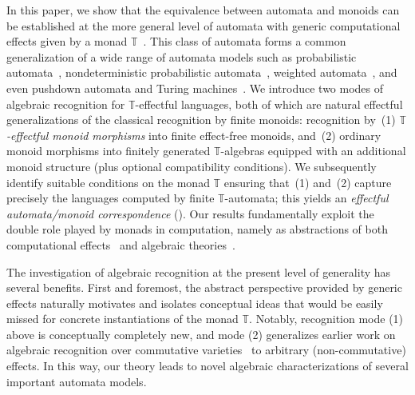\documentclass[a4paper, UKenglish, numberwithinsect, thm-restate, cleveref, final]{lipics-v2021}
\theoremstyle{plain}
\theoremstyle{definition}
\newcommand{\T}{\ensuremath{\mathbb{T}}\xspace}
\numberwithin{equation}{section}
\begin{document}
In this paper, we show that the equivalence between automata and monoids can be established at the more general level of automata with generic computational effects given by a monad $\T$~\cite{sbbr13,gms14}. This class of automata forms a common generalization of a wide range of automata models such as  probabilistic automata~\cite{Rabin63}, nondeterministic probabilistic automata~\cite{hhos18}, weighted automata~\cite{dkv09}, and even pushdown automata and Turing machines~\cite{gms14}. We introduce two modes of algebraic recognition for $\T$-effectful languages, both of which are natural effectful generalizations of the classical recognition by finite monoids: recognition by~(1) \emph{$\T$-effectful monoid morphisms} into finite effect-free monoids, and~(2) ordinary monoid morphisms into finitely generated $\T$-algebras equipped with an additional monoid structure (plus optional compatibility conditions).
We subsequently identify suitable conditions on the monad $\T$ ensuring that~(1) and~(2) capture precisely the languages computed by finite $\T$-automata; this yields an \emph{effectful automata/monoid correspondence} (). Our results fundamentally exploit the double role played by monads in computation, namely as abstractions of both computational effects~\cite{moggi91} and algebraic theories~\cite{manes76}.

The investigation of algebraic recognition at the present level of generality has several benefits. First and foremost, the abstract perspective provided by generic effects naturally motivates and isolates conceptual ideas that would be easily missed for concrete instantiations of the monad $\T$. Notably, recognition mode (1) above is conceptually completely new, and mode (2) generalizes earlier work on algebraic recognition over commutative varieties~\cite{amu18} to arbitrary (non-commutative) effects. In this way, our theory leads to novel algebraic characterizations of several important automata models.
\end{document}
